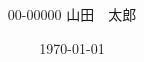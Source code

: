 \documentclass[uplatex, a4paper, 12pt]{jsbook}
\title{
  \scalebox{1.0}{ほげほげほげほげ}\\
  \vspace{0.3zh}
  \scalebox{1.0}{ぴよぴよぴよぴよぴよぴよぴよぴよ}\\
  \vspace{-3zh}
}
\date{\today}
\author{00-00000 山田　太郎}
\begin{document}
\frontmatter{}
%

%
\mainmatter{}
%

%

%

%

%

%
% 
%
\backmatter{}
%

%
\end{document}
